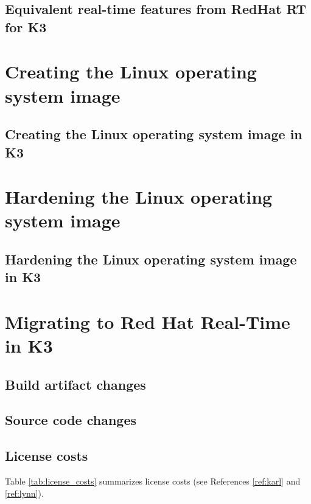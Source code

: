 \documentclass[12pt]{article}
\begin{document}
\subsection{Equivalent real-time features from RedHat RT for K3}

%
\newpage
\section{Creating the Linux operating system image}
\label{sec:image_creation}

\subsection{Creating the Linux operating system image in K3}


%
\newpage
\section{Hardening the Linux operating system image}
\label{sec:image_hardening}

\subsection{Hardening the Linux operating system image in K3}


%
\newpage
\section{Migrating to Red Hat Real-Time in K3}
\label{sec:redhat_migration}


\subsection{Build artifact changes}


\subsection{Source code changes}


\subsection{License costs}

Table \ref{tab:license_costs} summarizes license costs (see References \ref{ref:karl} and \ref{ref:lynn}).
\end{document}
